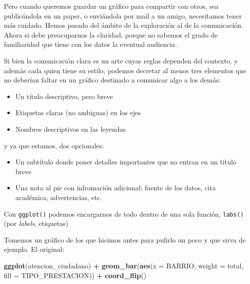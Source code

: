 \documentclass[]{book}
\newenvironment{Shaded}{\begin{snugshade}}{\end{snugshade}}
\newcommand{\KeywordTok}[1]{\textcolor[rgb]{0.13,0.29,0.53}{\textbf{#1}}}
\newcommand{\DataTypeTok}[1]{\textcolor[rgb]{0.13,0.29,0.53}{#1}}
\newcommand{\StringTok}[1]{\textcolor[rgb]{0.31,0.60,0.02}{#1}}
\newcommand{\OperatorTok}[1]{\textcolor[rgb]{0.81,0.36,0.00}{\textbf{#1}}}
\newcommand{\NormalTok}[1]{#1}
\providecommand{\tightlist}{%
  \setlength{\itemsep}{0pt}\setlength{\parskip}{0pt}}
\begin{document}
Pero cuando queremos guardar un gráfico para compartir con otros, sea
publicándola en un paper, o enviándola por mail a un amigo, necesitamos
tener más cuidado. Hemos pasado del ámbito de la exploración al de la
comunicación. Ahora si debe preocuparnos la claridad, porque no sabemos
el grado de familiaridad que tiene con los datos la eventual audiencia.

Si bien la comunicación clara es un arte cuyas reglas dependen del
contexto, y además cada quien tiene su estilo, podemos decretar al menos
tres elementos que no deberían faltar en un gráfico destinado a
comunicar algo a los demás:

\begin{itemize}
\tightlist
\item
  Un título descriptivo, pero breve
\item
  Etiquetas claras (no ambiguas) en los ejes
\item
  Nombres descriptivos en las leyendas
\end{itemize}

y ya que estamos, dos opcionales:

\begin{itemize}
\tightlist
\item
  Un subtítulo donde poner detalles importantes que no entran en un
  título breve
\item
  Una nota al pie con infromación adicional: fuente de los datos, cita
  académica, advertencias, etc.
\end{itemize}

Con \texttt{ggplot()} podemos encargarnos de todo dentro de una sola
función, \texttt{labs()} (por \emph{labels}, etiquetas)

Tomemos un gráfico de los que hicimos antes para pulirlo un poco y que
sirva de ejemplo. El original:

\begin{Shaded}
\begin{Highlighting}[]
\KeywordTok{ggplot}\NormalTok{(atencion_ciudadano) }\OperatorTok{+}
\StringTok{    }\KeywordTok{geom_bar}\NormalTok{(}\KeywordTok{aes}\NormalTok{(}\DataTypeTok{x =}\NormalTok{ BARRIO, }\DataTypeTok{weight =}\NormalTok{ total, }\DataTypeTok{fill =}\NormalTok{ TIPO_PRESTACION)) }\OperatorTok{+}
\StringTok{    }\KeywordTok{coord_flip}\NormalTok{()}
\end{Highlighting}
\end{Shaded}
\end{document}

